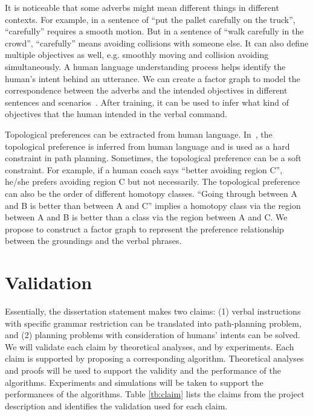 \documentclass[phd]{byuprop}
\begin{document}
It is noticeable that some adverbs might mean different things in different contexts.
For example, in a sentence of ``put the pallet carefully on the truck'', ``carefully'' requires a smooth motion. 
But in a sentence of ``walk carefully in the crowd'', ``carefully'' means avoiding collisions with someone else.
It can also define multiple objectives as well, e.g. smoothly moving and collision avoiding simultaneously.
A human language understanding process helps identify the human's intent behind an utterance.
We can create a factor graph to model the correspondence between the adverbs and the intended objectives in different sentences and scenarios~\cite{tellex2011understanding}.
After training, it can be used to infer what kind of objectives that the human intended in the verbal command.

Topological preferences can be extracted from human language.
In~\cite{howard2014natural}, the topological preference is inferred from human language and is used as a hard constraint in path planning.
Sometimes, the topological preference can be a soft constraint.
For example, if a human coach says ``better avoiding region C'', he/she prefers avoiding region C but not necessarily.
The topological preference can also be the order of different homotopy classes.
``Going through between A and B is better than between A and C'' implies a homotopy class via the region between A and B is better than a class via the region between A and C.
We propose to construct a factor graph to represent the preference relationship between the groundings and the verbal phrases.


\section{Validation}
\label{sec:validation}

Essentially, the dissertation statement makes two claims:
(1) verbal instructions with specific grammar restriction can be translated into path-planning problem,
and (2) planning problems with  consideration of humans' intents can be solved.
We will validate each claim by theoretical analyses, and by experiments.
Each claim is supported by proposing a corresponding algorithm.
Theoretical analyses and proofs will be used to support the validity and the performance of the algorithms.
Experiments and simulations will be taken to support the performances of the algorithms.
Table \ref{tb:claim} lists the claims from the project description and identifies the validation used for each claim.
\end{document}
